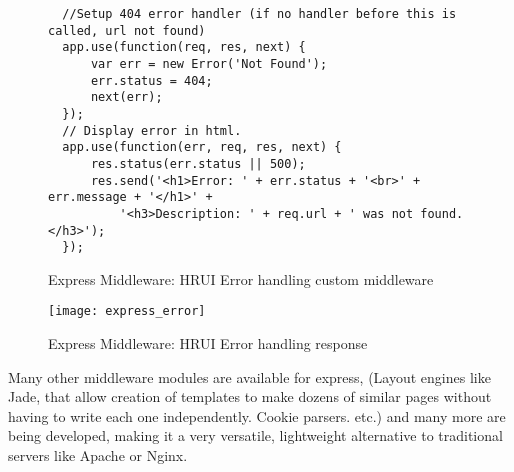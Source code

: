 \begin{itemize}
\begin{figure}[H]
\begin{verbatim}
  //Setup 404 error handler (if no handler before this is called, url not found)
  app.use(function(req, res, next) {
      var err = new Error('Not Found');
      err.status = 404;
      next(err);
  });
  // Display error in html.
  app.use(function(err, req, res, next) {
      res.status(err.status || 500);
      res.send('<h1>Error: ' + err.status + '<br>' + err.message + '</h1>' +
          '<h3>Description: ' + req.url + ' was not found.</h3>');
  });
  \end{verbatim}
  \caption{Express Middleware: HRUI Error handling custom middleware}
  \end{figure}
  \begin{figure}[H]
  \captionsetup{justification=centering}
  \begin{center}
    \texttt{[image: express\_error]}
  \end{center}
  \caption{Express Middleware: HRUI Error handling response}
  \end{figure}
\end{itemize}
Many other middleware modules are available for express, (Layout engines like Jade, that allow creation of templates to make dozens of
similar pages without having to write each one independently. Cookie parsers. etc.) and many more are being developed, making it a very
versatile, lightweight alternative to traditional servers like Apache or Nginx.
